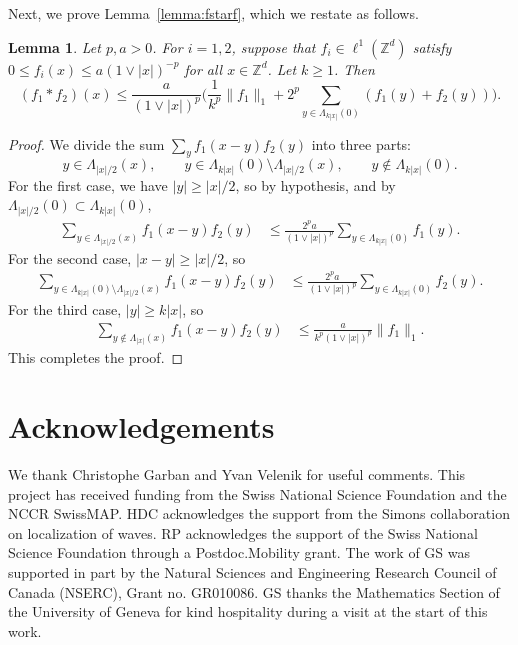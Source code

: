 \documentclass[11pt,a4paper]{article}
\numberwithin{equation}{section}
\theoremstyle{plain}
\newtheorem{Lem}[Thm]{Lemma}
\theoremstyle{definition}
\newcommand\1{\mathds{1}}
\begin{document}
Next, we prove Lemma~\ref{lemma:fstarf}, which we restate as follows.


\begin{Lem}
Let $p,a>0$.
For $i=1,2$, suppose that $f_i \in \ell^1(\mathbb Z^d)$
satisfy $0 \le f_i(x) \le a(1\vee |x|)^{-p}$ for all $x\in\mathbb Z^d$.
Let $k\ge 1$. Then
\begin{equation}
    (f_1*f_2)(x)
    \le
    \frac{a}{(1\vee |x|)^p}
    \Big(  \frac{1}{k^{p}}  \|f_1\|_1
    + 2^{p} \sum_{y \in \Lambda_{k|x|}(0)}(f_1(y)+f_2(y)) \Big).
\end{equation}
\end{Lem}

\begin{proof}
We divide the sum $\sum_y f_1(x-y)f_2(y)$ into three parts:
\begin{equation}
    y \in \Lambda_{|x|/2}(x), \qquad y \in \Lambda_{k|x|}(0)\setminus \Lambda_{|x|/2}(x),
    \qquad y \notin \Lambda_{k|x|}(0).
\end{equation}
For the first case, we have $|y| \ge |x|/2$, so by hypothesis,
and by $\Lambda_{|x|/2}(0) \subset \Lambda_{k|x|}(0)$,
\begin{align}
    \sum_{y \in \Lambda_{|x|/2}(x)} f_1(x-y)f_2(y)
    & \le
    \frac{2^p a}{(1\vee |x|)^p} \sum_{y \in \Lambda_{k|x|}(0)}f_1(y).
\end{align}
For the second case, $|x-y|\ge |x|/2$, so
\begin{align}
    \sum_{y \in \Lambda_{k|x|}(0)\setminus \Lambda_{|x|/2}(x)} f_1(x-y)f_2(y)
    & \le
    \frac{2^p a}{(1\vee |x|)^p} \sum_{y \in \Lambda_{k|x|}(0)}f_2(y).
\end{align}
For the third case, $|y|\ge k|x|$, so
\begin{align}
    \sum_{y \notin \Lambda_{|x|}(x)} f_1(x-y)f_2(y)
    & \le
    \frac{a}{k^p(1\vee |x|)^p} \|f_1\|_1.
\end{align}
This completes the proof.
\end{proof}




\section*{Acknowledgements}
\noindent
We thank Christophe Garban and Yvan Velenik for useful comments.
 This project has received funding from the Swiss National Science
Foundation and the NCCR SwissMAP. HDC acknowledges the support from the Simons
collaboration on localization of waves. RP acknowledges the support of the Swiss National Science Foundation through a Postdoc.Mobility grant.
 The work of GS was supported in part by the Natural Sciences and Engineering Research Council of Canada (NSERC), Grant no. GR010086.
GS thanks the
Mathematics Section
of the University of Geneva for kind hospitality during a visit
at the start of this work.



\end{document}
